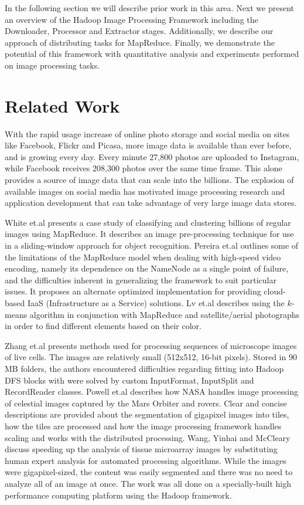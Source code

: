 \documentclass[conference]{IEEEtran}
\begin{document}
In the following section we will describe prior work in this
area. Next we present an overview of the Hadoop Image Processing
Framework including the Downloader, Processor and Extractor
stages. Additionally, we describe our approach of distributing tasks
for MapReduce. Finally, we demonstrate the potential of this framework
with quantitative analysis and experiments performed on image
processing tasks.
	
\section{Related Work}
With the rapid usage increase of online photo storage and social media
on sites like Facebook, Flickr and Picasa, more image data is
available than ever before, and is growing every day.  Every minute
27,800 photos are uploaded to Instagram,\cite{Horaczek2013} while
Facebook receives 208,300 photos over the same time frame. This alone
provides a source of image data that can scale into the billions.  The
explosion of available images on social media has motivated image
processing research and application development that can take
advantage of very large image data stores.

White et.al \cite{White2010} presents a case study of classifying and
clustering billions of regular images using MapReduce.  It describes
an image pre-processing technique for use in a sliding-window approach
for object recognition.  Pereira et.al \cite{Pereira2010} outlines
some of the limitations of the MapReduce model when dealing with
high-speed video encoding, namely its dependence on the NameNode as a
single point of failure, and the difficulties inherent in generalizing
the framework to suit particular issues.  It proposes an alternate
optimized implementation for providing cloud-based IaaS
(Infrastructure as a Service) solutions.  Lv et.al \cite{Lv2010}
describes using the $k$-means algorithm in conjunction with MapReduce
and satellite/aerial photographs in order to find different elements
based on their color.

Zhang et.al \cite{Zhang2010} presents methods used for processing
sequences of microscope images of live cells. The images are
relatively small (512x512, 16-bit pixels).  Stored in 90 MB folders,
the authors encountered difficulties regarding fitting into Hadoop DFS
blocks with were solved by custom InputFormat, InputSplit and
RecordReader classes.  Powell et.al \cite{Powell2010} describes how
NASA handles image processing of celestial images captured by the Mars
Orbiter and rovers. Clear and concise descriptions are provided about
the segmentation of gigapixel images into tiles, how the tiles are
processed and how the image processing framework handles scaling and
works with the distributed processing. Wang, Yinhai and
McCleary\cite{Wang2011} discuss speeding up the analysis of tissue
microarray images by substituting human expert analysis for automated
processing algorithms. While the images were gigapixel-sized, the
content was easily segmented and there was no need to analyze all of
an image at once. The work was all done on a specially-built high
performance computing platform using the Hadoop framework.
\end{document}
